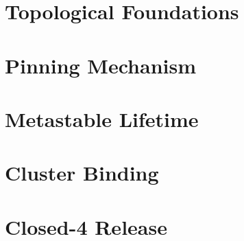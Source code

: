 \documentclass[11pt,a4paper,twoside,openright]{book}
\begin{document}
\part{Topological Foundations}
\label{part:foundations}






\part{Pinning Mechanism}
\label{part:pinning}





\part{Metastable Lifetime}
\label{part:metastable}







\part{Cluster Binding}
\label{part:binding}






\part{Closed-4 Release}
\label{part:release}
\end{document}
